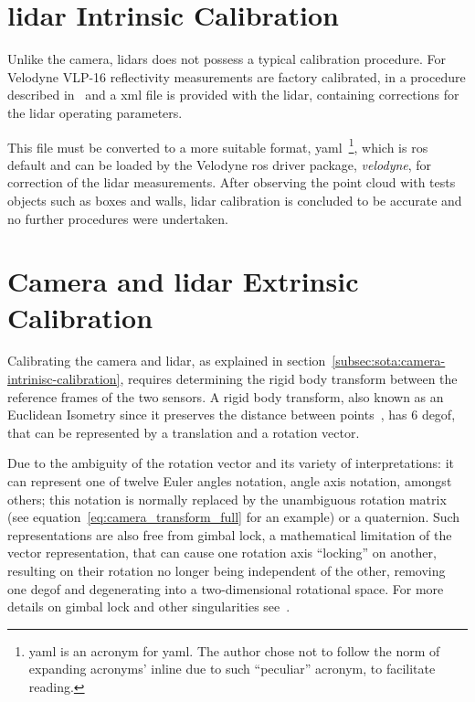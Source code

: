 	

\section{\ac{lidar} Intrinsic Calibration}
Unlike the camera, \acp{lidar} does not possess a typical calibration procedure. For Velodyne VLP-16 reflectivity measurements are factory calibrated, in a procedure described in~\cite{vlp16} and a \ac{xml} file is provided with the \ac{lidar}, containing corrections for the \ac{lidar} operating parameters.

This file must be converted to a more suitable format, \acs{yaml}~\footnote{\acs{yaml} is an acronym for \acl{yaml}. The author chose not to follow the norm of expanding acronyms' inline due to such  ``peculiar'' acronym, to facilitate reading.}, which is \ac{ros} default and can be loaded by the Velodyne \ac{ros} driver package, \emph{velodyne}, for correction of the \ac{lidar} measurements. After observing the point cloud with tests objects such as boxes and walls, \ac{lidar} calibration is concluded to be accurate and no further procedures were undertaken.

\section{Camera and \ac{lidar} Extrinsic Calibration}
\label{sec:calibration:extrinsic}
Calibrating the camera and \ac{lidar}, as explained in section~\ref{subsec:sota:camera-intrinisc-calibration}, requires determining the rigid body transform between the reference frames of the two sensors. A rigid body transform, also known as an Euclidean Isometry since it preserves the distance between points~\cite{mvg_book}, has 6 \ac{degof}, that can be represented by a translation and a rotation vector.

Due to the ambiguity of the rotation vector and its variety of interpretations: it can represent one of twelve Euler angles notation, angle axis notation, amongst others; this notation is normally replaced by the unambiguous rotation matrix (see equation~\ref{eq:camera_transform_full} for an example) or a quaternion. Such representations are also free from gimbal lock, a mathematical limitation of the vector representation, that can cause one rotation axis ``locking'' on another, resulting on their rotation no longer being independent of the other, removing one \ac{degof} and degenerating into a two-dimensional rotational space. For more details on gimbal lock and other singularities see~\cite{mvg_book, Slabaugh, camera_models}.

